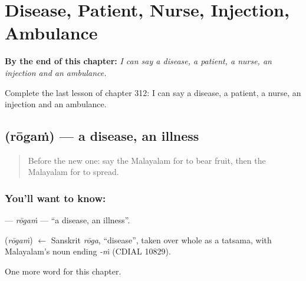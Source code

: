 
\chapter{Disease, Patient, Nurse, Injection, Ambulance}
\label{ch:ml-disease-patient-nurse-injection-ambulance}

\begin{chapteropening}
\textbf{By the end of this chapter:} \emph{I can say a disease, a patient, a nurse, an injection and an ambulance.}

Complete the last lesson of chapter 312: I can say a disease, a patient, a nurse, an injection and an ambulance.
\end{chapteropening}

\section[\texorpdfstring{\ml{രോഗം} (rōgaṁ)}{രോഗം (rōgaṁ)}]{ (rōgaṁ) — a disease, an illness}

\label{lesson:ML-C312-rogam}



\begin{quote}
Before the new one: say the Malayalam for to bear fruit, then the Malayalam for to spread.
\end{quote}

\subsection*{You'll want to know: }
\textbf{} — \emph{rōgaṁ} — \textquotedblleft{}a disease, an illness\textquotedblright{}.

\begin{cousinweb}
\textbf{} (\emph{rōgaṁ}) $\leftarrow$ Sanskrit \emph{rōga}, \textquotedblleft{}disease\textquotedblright{}, taken over whole as a tatsama, with Malayalam's noun ending \emph{-ṁ} (CDIAL 10829).
\end{cousinweb}

\begin{grammarlens}[title={What you've built}]
One more word for this chapter.
\end{grammarlens}

